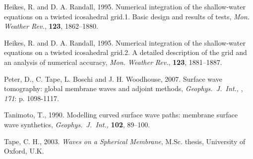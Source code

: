 \documentclass[a4paper,
                          headsepline,
                          listof=totoc,
                          toc=listof,
                          headings=small]{scrreprt} %
\newcommand{\gji}{\textit{Geophys.\ J.\ Int.,} }
\begin{document}
%
\begin{thebibliography}{Bibliography}

 Heikes, R. and D. A. Randall, 1995.
{Numerical integration of the shallow-water equations on a twisted icosahedral grid.1.
Basic design and results of tests}, \textit{Mon. Weather Rev.}, \textbf{123}, 1862--1880.

 Heikes, R. and D. A. Randall, 1995.
{Numerical integration of the shallow-water equations on a twisted icosahedral grid.2.
A detailed description of the grid and an analysis of numerical accuracy},
\textit{Mon. Weather Rev.}, \textbf{123}, 1881--1887.

 Peter, D., C. Tape, L. Boschi and J. H. Woodhouse, 2007. Surface wave tomography: global membrane waves and adjoint methods, \textit{\gji}, \textit{171}: p. 1098-1117.

 Tanimoto, T., 1990.
{Modelling curved surface wave paths: membrane surface wave synthetics}, \gji \textbf{102}, 89--100.

 Tape, C. H., 2003.
\textit{Waves on a Spherical Membrane}, M.Sc. thesis, University of Oxford, U.K.

\end{thebibliography}


\end{document}
